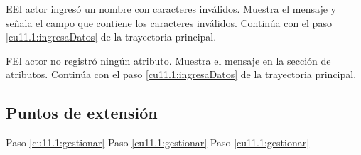  \begin{UCtrayectoriaA}{E}{El actor ingresó un nombre con caracteres inválidos.}
    \UCpaso[\UCsist] Muestra el mensaje  y señala el campo que contiene los caracteres inválidos.
    \UCpaso[] Continúa con el paso \ref{cu11.1:ingresaDatos} de la trayectoria principal.
 \end{UCtrayectoriaA}
 \begin{UCtrayectoriaA}{F}{El actor no registró ningún atributo.}
    \UCpaso[\UCsist] Muestra el mensaje  en la sección de atributos.
    \UCpaso[] Continúa con el paso \ref{cu11.1:ingresaDatos} de la trayectoria principal.
 \end{UCtrayectoriaA}
 
\subsection{Puntos de extensión}
 
	{Paso \ref{cu11.1:gestionar}}
	{}
	{Paso \ref{cu11.1:gestionar}}
	{}	
	{Paso \ref{cu11.1:gestionar}}
	{}
